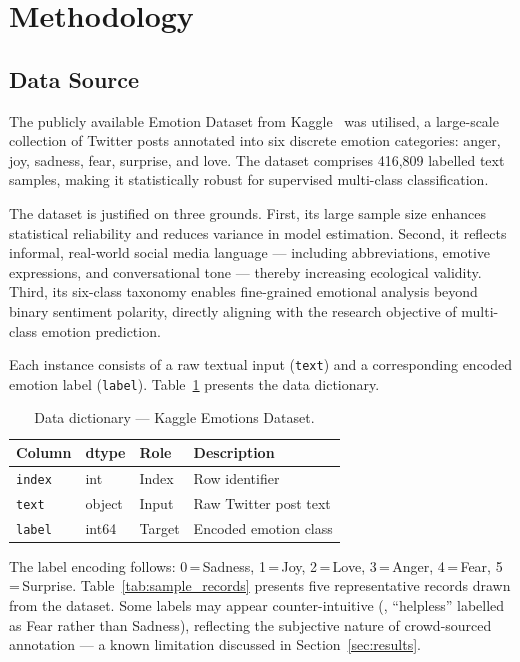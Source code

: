 \section{Methodology}
\label{sec:methodology}

\subsection{Data Source}

The publicly available Emotion Dataset from Kaggle~\citep{emotions_kaggle} was utilised, a large-scale collection of Twitter posts annotated into six discrete emotion categories: anger, joy, sadness, fear, surprise, and love. The dataset comprises 416,809 labelled text samples, making it statistically robust for supervised multi-class classification.

The dataset is justified on three grounds. First, its large sample size enhances statistical reliability and reduces variance in model estimation. Second, it reflects informal, real-world social media language --- including abbreviations, emotive expressions, and conversational tone --- thereby increasing ecological validity. Third, its six-class taxonomy enables fine-grained emotional analysis beyond binary sentiment polarity, directly aligning with the research objective of multi-class emotion prediction.

Each instance consists of a raw textual input (\texttt{text}) and a corresponding encoded emotion label (\texttt{label}). Table~\ref{tab:data_dict} presents the data dictionary.

\begin{table}[H]
\centering
\caption{Data dictionary --- Kaggle Emotions Dataset.}
\label{tab:data_dict}
\footnotesize
\begin{tabular}{@{}llll@{}}
\toprule
\textbf{Column} & \textbf{dtype} & \textbf{Role} & \textbf{Description} \\
\midrule
\texttt{index} & int & Index & Row identifier \\
\texttt{text} & object & Input & Raw Twitter post text \\
\texttt{label} & int64 & Target & Encoded emotion class \\
\bottomrule
\end{tabular}
\end{table}

The label encoding follows: 0\,=\,Sadness, 1\,=\,Joy, 2\,=\,Love, 3\,=\,Anger, 4\,=\,Fear, 5\,=\,Surprise. Table~\ref{tab:sample_records} presents five representative records drawn from the dataset. Some labels may appear counter-intuitive (\eg, ``helpless'' labelled as Fear rather than Sadness), reflecting the subjective nature of crowd-sourced annotation --- a known limitation discussed in Section~\ref{sec:results}.

